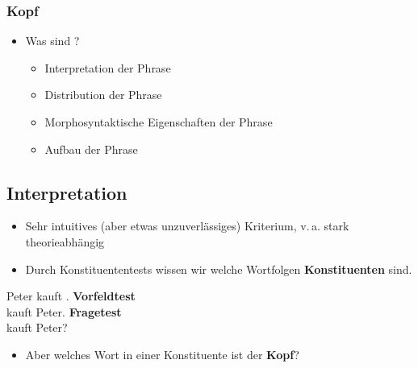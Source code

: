 \begin{frame}
\frametitle{Kopf}

\begin{itemize}
	\item Was sind ?
	\begin{itemize}
		\item Interpretation der Phrase
		\item Distribution der Phrase
		\item Morphosyntaktische Eigenschaften der Phrase
		\item Aufbau der Phrase
		
	\end{itemize}
\end{itemize}

\citep[vgl.][]{Adger04a}
\end{frame}


\subsection{Interpretation}

\begin{frame}

\begin{itemize}
	\item Sehr intuitives (aber etwas unzuverlässiges) Kriterium, v.\,a. stark theorieabhängig
	\item Durch Konstituententests wissen wir welche Wortfolgen \textbf{Konstituenten} sind.
\end{itemize}
\pause
\eal Peter kauft .
\pause
\ex \textbf{Vorfeldtest}\\
 kauft Peter. 
\pause
\ex \textbf{Fragetest}\\
\alertred{{[}Was]} kauft Peter? \ras {}
\zl


\pause
\begin{itemize}
	\item Aber welches Wort in einer Konstituente ist der \textbf{Kopf}?
\end{itemize} 

\end{frame}


